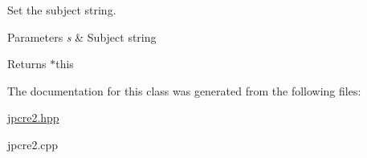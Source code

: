 Set the subject string. 


\begin{DoxyParams}{Parameters}
{\em s} & Subject string \\
\hline
\end{DoxyParams}
\begin{DoxyReturn}{Returns}
$\ast$this 
\end{DoxyReturn}


The documentation for this class was generated from the following files\+:\begin{DoxyCompactItemize}
\item 
\hyperlink{jpcre2_8hpp}{jpcre2.\+hpp}\item 
jpcre2.\+cpp\end{DoxyCompactItemize}
